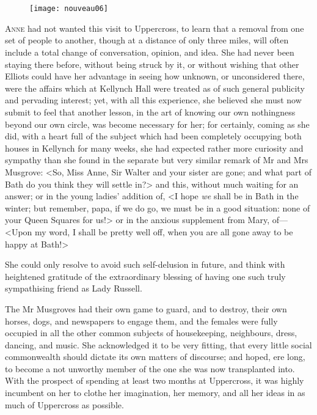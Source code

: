 \chapter[Chapter \thechapter]{}

\begin{figure}[t!]
\centering
\texttt{[image: nouveau06]}
\end{figure}

\lettrine[lraise=0.3]{A}{nne} had not wanted this visit to Uppercross, to learn that a removal from one set of people to another, though at a distance of only three miles, will often include a total change of conversation, opinion, and idea. She had never been staying there before, without being struck by it, or without wishing that other Elliots could have her advantage in seeing how unknown, or unconsidered there, were the affairs which at Kellynch Hall were treated as of such general publicity and pervading interest; yet, with all this experience, she believed she must now submit to feel that another lesson, in the art of knowing our own nothingness beyond our own circle, was become necessary for her; for certainly, coming as she did, with a heart full of the subject which had been completely occupying both houses in Kellynch for many weeks, she had expected rather more curiosity and sympathy than she found in the separate but very similar remark of Mr and Mrs Musgrove: <So, Miss Anne, Sir Walter and your sister are gone; and what part of Bath do you think they will settle in?> and this, without much waiting for an answer; or in the young ladies' addition of, <I hope \textit{we} shall be in Bath in the winter; but remember, papa, if we do go, we must be in a good situation: none of your Queen Squares for us!> or in the anxious supplement from Mary, of—<Upon my word, I shall be pretty well off, when you are all gone away to be happy at Bath!>

She could only resolve to avoid such self-delusion in future, and think with heightened gratitude of the extraordinary blessing of having one such truly sympathising friend as Lady Russell.

The Mr Musgroves had their own game to guard, and to destroy, their own horses, dogs, and newspapers to engage them, and the females were fully occupied in all the other common subjects of housekeeping, neighbours, dress, dancing, and music. She acknowledged it to be very fitting, that every little social commonwealth should dictate its own matters of discourse; and hoped, ere long, to become a not unworthy member of the one she was now transplanted into. With the prospect of spending at least two months at Uppercross, it was highly incumbent on her to clothe her imagination, her memory, and all her ideas in as much of Uppercross as possible.

